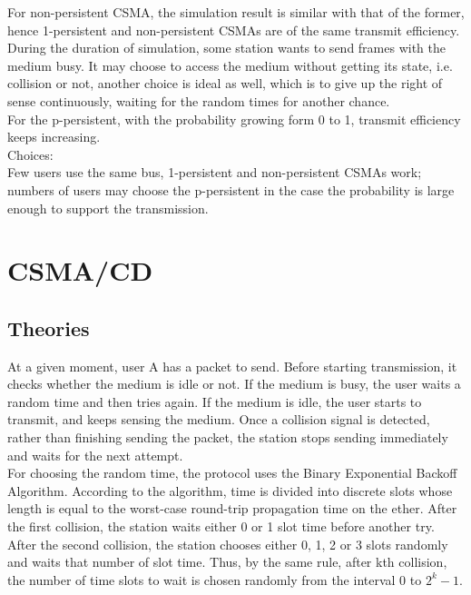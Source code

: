 \documentclass[11pt,a4paper]{report}
\begin{document}
For non-persistent CSMA, the simulation result is similar with that of the former, hence 1-persistent and non-persistent CSMAs are of the same transmit efficiency. \\
During the duration of simulation, some station wants to send frames with the medium busy. It may choose to access the medium without getting its state, i.e. collision or not, another choice is ideal as well, which is to give up the right of sense continuously, waiting for the random times for another chance. \\

For the p-persistent, with the probability growing form 0 to 1, transmit efficiency keeps increasing. \\

Choices: \\
Few users use the same bus, 1-persistent and non-persistent CSMAs work; numbers of users may choose the p-persistent in the case the probability is large enough to support the transmission.

\section*{CSMA/CD}
\subsection*{Theories}
At a given moment, user A has a packet to send. Before starting transmission, it checks whether the medium is idle or not. If the medium is busy, the user waits a random time and then tries again. If the medium is idle, the user starts to transmit, and keeps sensing the medium. Once a collision signal is detected, rather than finishing sending the packet, the station stops sending immediately and waits for the next attempt. \\

For choosing the random time, the protocol uses the Binary Exponential Backoff Algorithm. According to the algorithm, time is divided into discrete slots whose length is equal to the worst-case round-trip propagation time on the ether. After the first collision, the station waits either 0 or 1 slot time before another try. After the second collision, the station chooses either 0, 1, 2 or 3 slots randomly and waits that number of slot time. Thus, by the same rule, after kth collision, the number of time slots to wait is chosen randomly from the interval 0 to \(2^k-1\). \\
\end{document}
